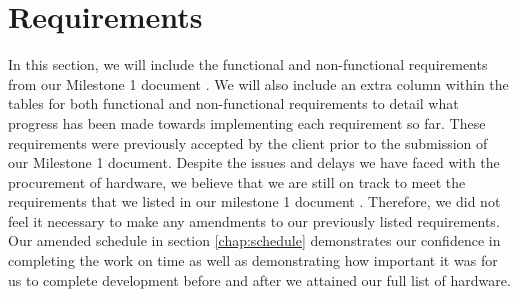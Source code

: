 \chapter{Requirements} \label{ch:Requirements}

In this section, we will include the functional and non-functional requirements from our Milestone 1 document \cite{coaker}. We will also include an extra column within the tables for both functional and non-functional requirements to detail what progress has been made towards implementing each requirement so far. These requirements were previously accepted by the client prior to the submission of our Milestone 1 document. Despite the issues and delays we have faced with the procurement of hardware, we believe that we are still on track to meet the requirements that we listed in our milestone 1 document \cite{coaker}. Therefore, we did not feel it necessary to make any amendments to our previously listed requirements. Our amended schedule in section \ref{chap:schedule} demonstrates our confidence in completing the work on time as well as demonstrating how important it was for us to complete development before and after we attained our full list of hardware.



